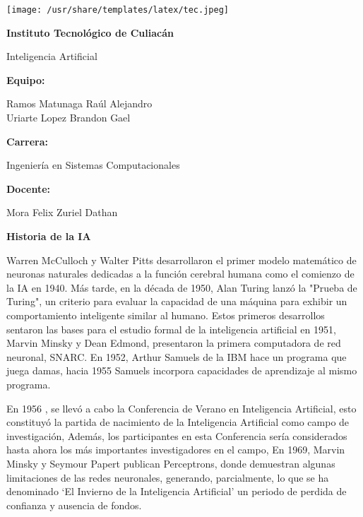 \documentclass[14pt]{extarticle}
\begin{document}
  
  \thispagestyle{empty}

  \texttt{[image: /usr/share/templates/latex/tec.jpeg]}

  \begin{center}
    {\LARGE \textbf{Instituto Tecnológico de Culiacán}}

    \vspace{1cm}
    {\Large Inteligencia Artificial}

    \vspace{4cm}
    {\large \textbf{Equipo:}}

    \vspace{0.3cm}
    {\large
      Ramos Matunaga Raúl Alejandro\\\vspace{0.3cm}
      Uriarte Lopez Brandon Gael
    }

    \vspace{2cm}
    {\large \textbf{Carrera:}}

    \vspace{0.3cm}
    {\large Ingeniería en Sistemas Computacionales}

    \vspace{2cm}
    {\large \textbf{Docente:}}

    \vspace{0.3cm}
    {\large Mora Felix Zuriel Dathan}
  \end{center}

  \newpage

  {\Large \textbf{Historia de la IA}}

  \vspace{0.5cm}
  Warren McCulloch y Walter Pitts desarrollaron el primer modelo matemático de neuronas naturales dedicadas a la función cerebral humana como el comienzo de la IA en 1940. Más tarde, en la década de 1950, Alan Turing lanzó la "Prueba de Turing", un criterio para evaluar la capacidad de una máquina para exhibir un comportamiento inteligente similar al humano. Estos primeros desarrollos sentaron las bases para el estudio formal de la inteligencia artificial en 1951, Marvin Minsky y Dean Edmond, presentaron la primera computadora de red neuronal, SNARC. En 1952, Arthur Samuels de la IBM hace un programa que juega damas, hacia 1955 Samuels incorpora capacidades de aprendizaje al mismo programa.

  \vspace{0.3cm}
  En 1956 , se llevó a cabo la Conferencia de Verano en Inteligencia Artificial, esto constituyó la partida de nacimiento de la Inteligencia Artificial como campo de investigación, Además, los participantes en esta Conferencia sería considerados hasta ahora los más importantes investigadores en el campo, En 1969, Marvin Minsky y Seymour Papert publican Perceptrons, donde demuestran algunas limitaciones de las redes neuronales, generando, parcialmente, lo que se ha denominado ‘El Invierno de la Inteligencia Artificial’ un periodo de perdida de confianza y ausencia de fondos.
\end{document}

